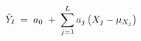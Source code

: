 \documentclass[preview]{standalone}
\begin{document}
\begin{align*}
\special{dvisvgm:raw <g id='unique000'>}\hat{Y}_\ell \;=\; a_0 \;+\; \sum_{j=1}^{L}a_j\,\big(X_j - \mu_{X_j}\big)\special{dvisvgm:raw </g>}
\end{align*}
\end{document}
